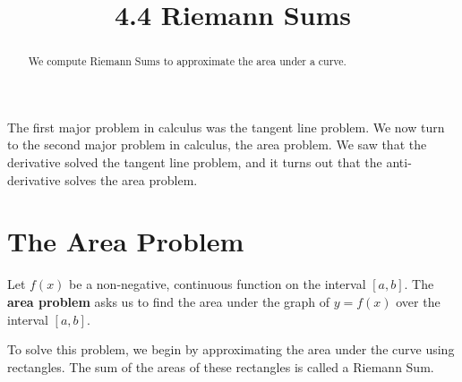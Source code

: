 \documentclass[handout]{ximera}
\title{4.4 Riemann Sums}
\begin{document}
\begin{abstract}
We compute Riemann Sums to approximate the area under a curve.
\end{abstract}

\maketitle

The first major problem in calculus was the tangent line problem. We now turn to the second major problem in calculus, the area problem.
We saw that the derivative solved the tangent line problem, and it turns out that the anti-derivative solves the area problem.
\section{The Area Problem}


Let $f(x)$ be a non-negative, continuous function on the interval $[a,b]$. The \textbf{area problem} asks us to find the area under the graph of $y = f(x)$
over the interval $[a,b]$.

\begin{image}
\end{image}

To solve this problem, we begin by approximating the area under the curve using rectangles. 
The sum of the areas of these rectangles is called a Riemann Sum.
\end{document}
